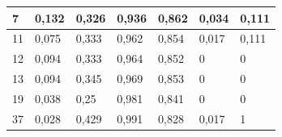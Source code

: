 \documentclass{classrep}
\begin{document}
{\begin{table}[h]
\begin{center}
\begin{tabular}{|l|l|l|l|l|l|l|}
7                                                        & 0,132                                                         & 0,326                                                            & 0,936                                                & 0,862                                                   & 0,034                                                   & 0,111                                                      \\ \hline
11                                                       & 0,075                                                         & 0,333                                                            & 0,962                                                & 0,854                                                   & 0,017                                                   & 0,111                                                      \\ \hline
12                                                       & 0,094                                                         & 0,333                                                            & 0,964                                                & 0,852                                                   & 0                                                       & 0                                                          \\ \hline
13                                                       & 0,094                                                         & 0,345                                                            & 0,969                                                & 0,853                                                   & 0                                                       & 0                                                          \\ \hline
19                                                       & 0,038                                                         & 0,25                                                             & 0,981                                                & 0,841                                                   & 0                                                       & 0                                                          \\ \hline
37                                                       & 0,028                                                         & 0,429                                                            & 0,991                                                & 0,828                                                   & 0,017                                                   & 1                                                          \\ \hline

\end{tabular}
\end{center}
\end{table}}
\end{document}
